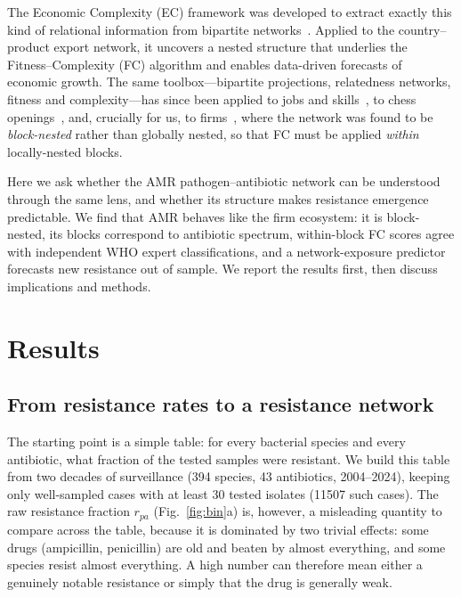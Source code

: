 \documentclass[11pt]{article}
\begin{document}
The Economic Complexity (EC) framework was developed to extract exactly this kind of relational
information from bipartite networks~\cite{hidalgo2009,tacchella2012}. Applied to the country--product
export network, it uncovers a nested structure that underlies the Fitness--Complexity (FC) algorithm
and enables data-driven forecasts of economic growth. The same toolbox---bipartite projections,
relatedness networks, fitness and complexity---has since been applied to jobs and skills~\cite{aufiero2024},
to chess openings~\cite{demarzo2023chess}, and, crucially for us, to firms~\cite{laudati2023}, where
the network was found to be \emph{block-nested} rather than globally nested, so that FC must be applied
\emph{within} locally-nested blocks.

Here we ask whether the AMR pathogen--antibiotic network can be understood through the same lens, and
whether its structure makes resistance emergence predictable. We find that AMR behaves like the firm
ecosystem: it is block-nested, its blocks correspond to antibiotic spectrum, within-block FC scores
agree with independent WHO expert classifications, and a network-exposure predictor forecasts new
resistance out of sample. We report the results first, then discuss implications and methods.

\section{Results}

\subsection{From resistance rates to a resistance network}
The starting point is a simple table: for every bacterial species and every antibiotic, what
fraction of the tested samples were resistant. We build this table from two decades of surveillance
(\num{394} species, \num{43} antibiotics, 2004--2024), keeping only well-sampled cases with at least
\num{30} tested isolates (\num{11507} such cases). The raw resistance fraction $r_{pa}$
(Fig.~\ref{fig:bin}a) is, however, a misleading quantity to compare across the table, because it is
dominated by two trivial effects: some drugs (ampicillin, penicillin) are old and beaten by almost
everything, and some species resist almost everything. A high number can therefore mean either a
genuinely notable resistance or simply that the drug is generally weak.
\end{document}
